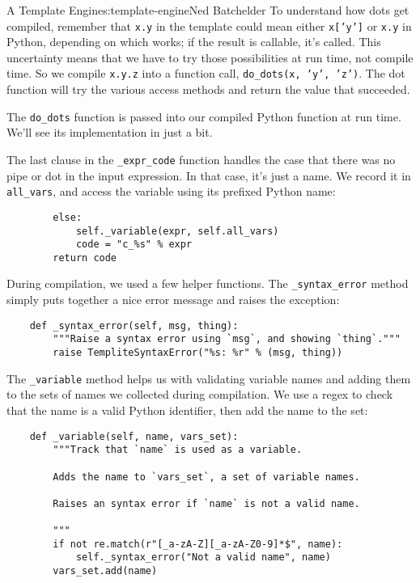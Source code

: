 \begin{aosachapter}{A Template Engine}{s:template-engine}{Ned Batchelder}
To understand how dots get compiled, remember that \texttt{x.y} in the
template could mean either \texttt{x{[}'y'{]}} or \texttt{x.y} in
Python, depending on which works; if the result is callable, it's
called. This uncertainty means that we have to try those possibilities
at run time, not compile time. So we compile \texttt{x.y.z} into a
function call, \texttt{do\_dots(x, 'y', 'z')}. The dot function will try
the various access methods and return the value that succeeded.

The \texttt{do\_dots} function is passed into our compiled Python
function at run time. We'll see its implementation in just a bit.

The last clause in the \texttt{\_expr\_code} function handles the case
that there was no pipe or dot in the input expression. In that case,
it's just a name. We record it in \texttt{all\_vars}, and access the
variable using its prefixed Python name:

\begin{verbatim}
        else:
            self._variable(expr, self.all_vars)
            code = "c_%s" % expr
        return code
\end{verbatim}

\label{helper-functions}

During compilation, we used a few helper functions. The
\texttt{\_syntax\_error} method simply puts together a nice error
message and raises the exception:

\begin{verbatim}
    def _syntax_error(self, msg, thing):
        """Raise a syntax error using `msg`, and showing `thing`."""
        raise TempliteSyntaxError("%s: %r" % (msg, thing))
\end{verbatim}

The \texttt{\_variable} method helps us with validating variable names
and adding them to the sets of names we collected during compilation. We
use a regex to check that the name is a valid Python identifier, then
add the name to the set:

\begin{verbatim}
    def _variable(self, name, vars_set):
        """Track that `name` is used as a variable.

        Adds the name to `vars_set`, a set of variable names.

        Raises an syntax error if `name` is not a valid name.

        """
        if not re.match(r"[_a-zA-Z][_a-zA-Z0-9]*$", name):
            self._syntax_error("Not a valid name", name)
        vars_set.add(name)
\end{verbatim}


\end{aosachapter}
